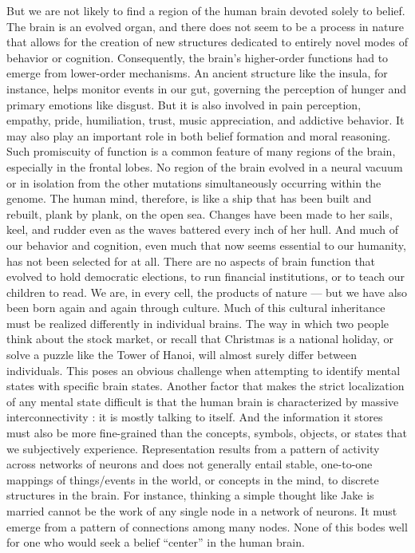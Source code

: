 \documentclass[a4paper,14pt]{extbook}
\begin{document}
But we are not likely to find a region of the human brain devoted solely to belief.
The brain is an evolved organ, and there does not seem to be a process in nature that allows for the creation of new structures dedicated to entirely novel modes of behavior or cognition.
Consequently, the brain’s higher-order functions had to emerge from lower-order mechanisms.
An ancient structure like the insula, for instance, helps monitor events in our gut, governing the perception of hunger and primary emotions like disgust.
But it is also involved in pain perception, empathy, pride, humiliation, trust, music appreciation, and addictive behavior.
It may also play an important role in both belief formation and moral reasoning.
Such promiscuity of function is a common feature of many regions of the brain, especially in the frontal lobes.
No region of the brain evolved in a neural vacuum or in isolation from the other mutations simultaneously occurring within the genome.
The human mind, therefore, is like a ship that has been built and rebuilt, plank by plank, on the open sea.
Changes have been made to her sails, keel, and rudder even as the waves battered every inch of her hull.
And much of our behavior and cognition, even much that now seems essential to our humanity, has not been selected for at all.
There are no aspects of brain function that evolved to hold democratic elections, to run financial institutions, or to teach our children to read.
We are, in every cell, the products of nature --- but we have also been born again and again through culture.
Much of this cultural inheritance must be realized differently in individual brains.
The way in which two people think about the stock market, or recall that Christmas is a national holiday, or solve a puzzle like the Tower of Hanoi, will almost surely differ between individuals.
This poses an obvious challenge when attempting to identify mental states with specific brain states.
Another factor that makes the strict localization of any mental state difficult is that the human brain is characterized by massive interconnectivity :
it is mostly talking to itself.
And the information it stores must also be more fine-grained than the concepts, symbols, objects, or states that we subjectively experience.
Representation results from a pattern of activity across networks of neurons and does not generally entail stable, one-to-one mappings of things/events in the world, or concepts in the mind, to discrete structures in the brain.
For instance, thinking a simple thought like Jake is married cannot be the work of any single node in a network of neurons.
It must emerge from a pattern of connections among many nodes.
None of this bodes well for one who would seek a belief ``center'' in the human brain.
\end{document}
